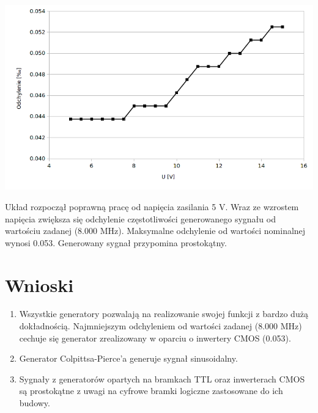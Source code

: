 \documentclass[a4paper,12pt]{article}
\begin{document}
\begin{center}
  \includegraphics[width=1\textwidth]{z2}
\end{center}
Układ rozpoczął poprawną pracę od napięcia zasilania 5 V. Wraz ze wzrostem napięcia zwiększa się odchylenie częstotliwości generowanego sygnału od wartościu zadanej (8.000 MHz). Maksymalne odchylenie od wartości nominalnej wynosi 0.053\permil. Generowany sygnał przypomina prostokątny.
\section {Wnioski}
\begin{enumerate}
\item Wszystkie generatory pozwalają na realizowanie swojej funkcji z bardzo dużą dokładnością. Najmniejszym odchyleniem od wartości zadanej (8.000 MHz) cechuje się generator zrealizowany w oparciu o inwertery CMOS (0.053\permil).
\item Generator Colpittsa-Pierce'a generuje sygnał sinusoidalny.
\item Sygnały z generatorów opartych na bramkach TTL oraz inwerterach CMOS są prostokątne z uwagi na cyfrowe bramki logiczne zastosowane do ich budowy.
\end{enumerate}
\end{document}
